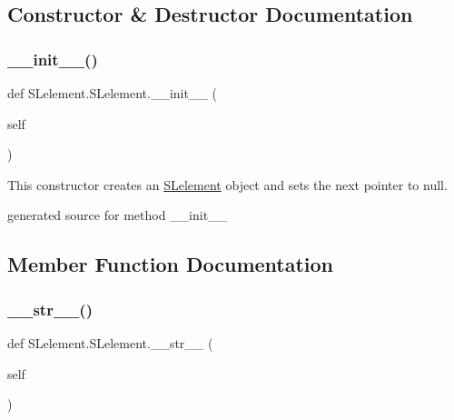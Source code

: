 \subsection{Constructor \& Destructor Documentation}
\hypertarget{class_s_lelement_1_1_s_lelement_ae26eaba46cd18873ff98829d5219e326}{}\label{class_s_lelement_1_1_s_lelement_ae26eaba46cd18873ff98829d5219e326} 
\subsubsection{\texorpdfstring{\+\_\+\+\_\+init\+\_\+\+\_\+()}{\_\_init\_\_()}}
{\footnotesize\ttfamily def S\+Lelement.\+S\+Lelement.\+\_\+\+\_\+init\+\_\+\+\_\+ (\begin{DoxyParamCaption}\item[{}]{self }\end{DoxyParamCaption})}



This constructor creates an \hyperlink{class_s_lelement_1_1_s_lelement}{S\+Lelement} object and sets the next pointer to null. 

\begin{DoxyVerb}generated source for method __init__ \end{DoxyVerb}
 

\subsection{Member Function Documentation}
\hypertarget{class_s_lelement_1_1_s_lelement_ac33402fd5847218346937547e451f52d}{}\label{class_s_lelement_1_1_s_lelement_ac33402fd5847218346937547e451f52d} 
\subsubsection{\texorpdfstring{\+\_\+\+\_\+str\+\_\+\+\_\+()}{\_\_str\_\_()}}
{\footnotesize\ttfamily def S\+Lelement.\+S\+Lelement.\+\_\+\+\_\+str\+\_\+\+\_\+ (\begin{DoxyParamCaption}\item[{}]{self }\end{DoxyParamCaption})}


